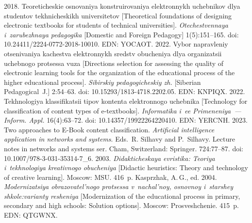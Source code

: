   \begin{multicols}{2}

\renewcommand{\bibname}{\protect\rmfamily References}

{\small\frenchspacing
 {%
 \begin{thebibliography}{99} 
 2018. Teoreticheskie osnovaniya konstruirovaniya 
elektronnykh uchebnikov dlya studentov tekhnicheskikh universitetov [Theoretical 
foundations of designing electronic textbooks for students of technical 
universities]. \textit{Otechestvennaya i~zarubezhnaya pedagogika} [Domestic and 
Foreign Pedagogy] 1(5):151--165. doi: 10.24411/2224-0772-2018-10010. 
EDN: YOCAOT.
 2022. Vybor 
napravleniy otsenivaniya kachestva elektronnykh sredstv obucheniya dlya 
organizatsii uchebnogo protsessa vuza [Directions selection for assessing the 
quality of electronic learning tools for the organization of the educational process 
of the higher educational process]. \textit{Sibirskiy pedagogicheskiy zh.} 
[Siberian Pedagogical~J.] 2:54--63. doi: 10.15293/1813-4718.2202.05. EDN: 
\mbox{KNPIQX}.
 2022. Tekhnologiya klassifikatsii tipov 
kontenta elektronnogo uchebnika [Technology for classification of content types of 
e-textbooks]. \textit{Informatika i~ee Primeneniya~--- Inform. Appl.}  
16(4):63--72.  doi: 10.14357/19922264220410. EDN: YERCNH.
 2023. Two approaches to E-Book content 
classification. \textit{Artificial intelligence application in networks and systems}. Eds.~R. Silhavy and P.~Silhavy. Lecture 
notes in networks and systems ser. Cham, Switzerland: Springer. 724:77--87. doi: 
10.1007/978-3-031-35314-7\_6.
 2003. \textit{Didakticheskaya evristika: Teoriya 
i~tekhnologiya kreativnogo obucheniya} [Didactic heuristics: Theory and 
technology of creative learning]. Moscow: MSU. 416~p.
Kasprzhak, A.\,G., ed. 2004. \textit{Mo\-der\-ni\-za\-tsiya ob\-ra\-zo\-va\-tel'\-no\-go pro\-tses\-sa 
v~na\-chal'\-noy, osnov\-noy i~star\-shey shko\-le:\linebreak va\-ri\-an\-ty re\-she\-niya} [Modernization of 
the educational process in primary, secondary and high schools: Solution options]. 
Moscow: Prosveshchenie. 415~p. EDN: \mbox{QTGWNX}.

\end{thebibliography}}}
\end{multicols}
